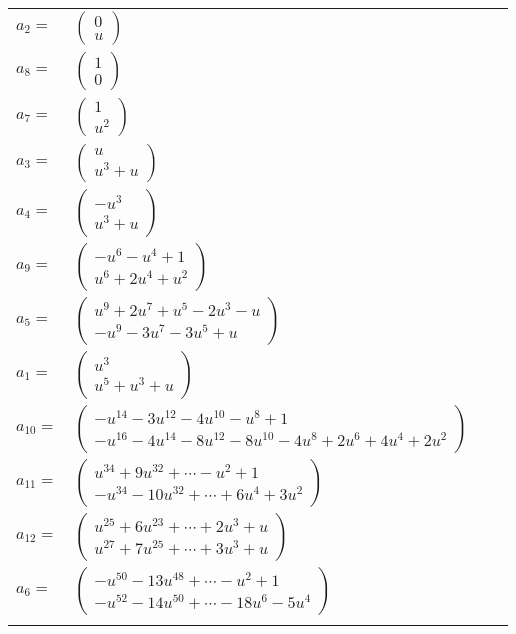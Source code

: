 \documentclass[1p]{elsarticle_modified}
\theoremstyle{definition}
\begin{document}
\begin{tabular}{m{7pt} m{180pt} m{7pt} m{180pt} }
\flushright $a_{2}=$&$\begin{pmatrix}0\\u\end{pmatrix}$ \\
\flushright $a_{8}=$&$\begin{pmatrix}1\\0\end{pmatrix}$ \\
\flushright $a_{7}=$&$\begin{pmatrix}1\\u^2\end{pmatrix}$ \\
\flushright $a_{3}=$&$\begin{pmatrix}u\\u^3+u\end{pmatrix}$ \\
\flushright $a_{4}=$&$\begin{pmatrix}- u^3\\u^3+u\end{pmatrix}$ \\
\flushright $a_{9}=$&$\begin{pmatrix}- u^6- u^4+1\\u^6+2 u^4+u^2\end{pmatrix}$ \\
\flushright $a_{5}=$&$\begin{pmatrix}u^9+2 u^7+u^5-2 u^3- u\\- u^9-3 u^7-3 u^5+u\end{pmatrix}$ \\
\flushright $a_{1}=$&$\begin{pmatrix}u^3\\u^5+u^3+u\end{pmatrix}$ \\
\flushright $a_{10}=$&$\begin{pmatrix}- u^{14}-3 u^{12}-4 u^{10}- u^8+1\\- u^{16}-4 u^{14}-8 u^{12}-8 u^{10}-4 u^8+2 u^6+4 u^4+2 u^2\end{pmatrix}$ \\
\flushright $a_{11}=$&$\begin{pmatrix}u^{34}+9 u^{32}+\cdots- u^2+1\\- u^{34}-10 u^{32}+\cdots+6 u^4+3 u^2\end{pmatrix}$ \\
\flushright $a_{12}=$&$\begin{pmatrix}u^{25}+6 u^{23}+\cdots+2 u^3+u\\u^{27}+7 u^{25}+\cdots+3 u^3+u\end{pmatrix}$ \\
\flushright $a_{6}=$&$\begin{pmatrix}- u^{50}-13 u^{48}+\cdots- u^2+1\\- u^{52}-14 u^{50}+\cdots-18 u^6-5 u^4\end{pmatrix}$\\&\end{tabular}
\end{document}
